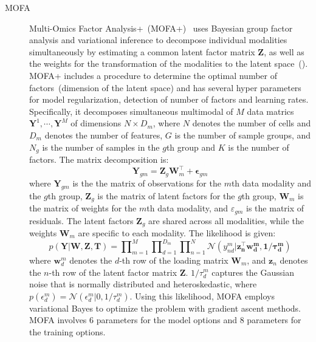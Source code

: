 \begin{description}
  \item[MOFA]
  Multi-Omics Factor Analysis+~(MOFA+)~\citep{argelaguet2020mofa+} uses Bayesian group factor analysis and variational inference to decompose individual modalities simultaneously by estimating a common latent factor matrix $\mathbf{Z}$, as well as the weights for the transformation of the modalities to the latent space~(). MOFA+ includes a procedure to determine the optimal number of factors~(dimension of the latent space) and has several hyper parameters for model regularization, detection of number of factors and learning rates. Specifically, it decomposes simultaneous multimodal of $M$ data matrics $\mathbf{Y}^1, \cdots, \mathbf{Y}^M$ of dimensions $N\times D_m$, where $N$ denotes the number of cells and $D_m$ denotes the number of features, $G$ is the number of sample groups, and $N_g$ is the number of samples in the $g$th group and $K$ is the number of factors. The matrix decomposition is:
  \begin{equation}
  \textbf{Y}_{gm} = \textbf{Z}_g\textbf{W}_m^{\top} + \bm{\epsilon}_{gm}
  \end{equation}
  where $\mathbf{Y}_{gm}$ is the the matrix of observations for the $m$th data modality and the $g$th group, $\mathbf{Z}_g$ is the matrix of latent factors for the $g$th group, $\mathbf{W}_m$ is the matrix of weights for the $m$th data modality, and $\varepsilon_{gm}$ is the matrix of residuals. The latent factors $\mathbf{Z}_g$ are shared across all modalities, while the weights $\mathbf{W}_m$ are specific to each modality. The likelihood is given:
\begin{equation}
    p(\mathbf{Y|\mathbf{W},\mathbf{Z},\mathbf{T}}) = \mathbf{\prod}_{m=1}^{M}\mathbf{\prod}_{d=1}^{D_m}\mathbf{\prod}_{n=1}^{N} \mathcal{N}(y_{nd}^m|\mathbf{z_n^\top \mathbf{w}_d^m, 1/\tau_d^m})
\end{equation}
    where $\mathbf{w}_d^m$ denotes the $d$-th row of the loading matrix $\mathbf{W}_m$, and $\mathbf{z}_n$ denotes the $n$-th row of the latent factor matrix $\mathbf{Z}$. $1/\tau_d^m$ captures the Gaussian noise that is normally distributed and heteroskedastic, where $p(\epsilon_d^m) = \mathcal{N}(\epsilon_d^m| 0, 1/\tau_d^m)$. Using this likelihood, MOFA employs variational Bayes to optimize the problem with gradient ascent methods. MOFA involves 6 parameters for the model options and 8 parameters for the training options.



\end{description}
